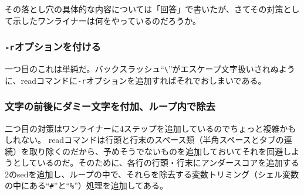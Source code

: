 その落とし穴の具体的な内容については「回答」で書いたが、さてその対策として示したワンライナーは何をやっているのだろうか。
\subsubsection*{\verb|-r|オプションを付ける}

一つ目のこれは単純だ。バックスラッシュ``\verb|\|''がエスケープ文字扱いされぬように、readコマンドに\verb|-r|オプションを追加すればそれでおしまいである。

\subsubsection*{文字の前後にダミー文字を付加、ループ内で除去}

二つ目の対策はワンライナーに4ステップを追加しているのでちょっと複雑かもしれない。
readコマンドは行頭と行末のスペース類（半角スペースとタブの連続）を取り除くのだから、予めそうでないものを追加しておいてそれを回避しようとしているのだ。そのために、各行の行頭・行末にアンダースコアを追加する2のsedを追加し、ループの中で、それらを除去する変数トリミング（シェル変数の中にある``\verb|#|''と``\verb|%|''）処理を追加してある。
